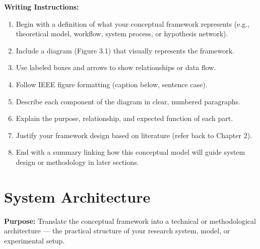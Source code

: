 {\color{red}\textbf{Writing Instructions:}
\begin{enumerate}
    \item Begin with a definition of what your conceptual framework represents (e.g., theoretical model, workflow, system process, or hypothesis network).
    
    \item Include a diagram (Figure 3.1) that visually represents the framework.
    
    \item Use labeled boxes and arrows to show relationships or data flow.
    
    \item Follow IEEE figure formatting (caption below, sentence case).
    
    \item Describe each component of the diagram in clear, numbered paragraphs.
    
    \item Explain the purpose, relationship, and expected function of each part.
    
    \item Justify your framework design based on literature (refer back to Chapter 2).
    
    \item End with a summary linking how this conceptual model will guide system design or methodology in later sections.
\end{enumerate}}

\section{System Architecture}

{\color{blue}\textbf{Purpose:}
Translate the conceptual framework into a technical or methodological architecture — the practical structure of your research system, model, or experimental setup.} \\

